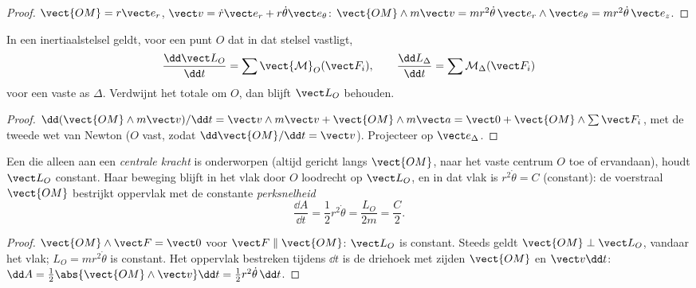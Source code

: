 \begin{proof}
$\vect{OM} = r\vect e_r$, $\vect v = \dot r\vect e_r + r\dot\theta\vect e_\theta$:
$\vect{OM}\wedge m\vect v = mr^2\dot\theta\,\vect e_r\wedge\vect e_\theta = mr^2\dot\theta\,\vect e_z$.
\end{proof}

\begin{theorem}[Impulsmomentstelling]\label{thm:b1:angular-momentum:theorem}
In een inertiaalstelsel geldt, voor een punt $O$ dat in dat stelsel vastligt,
\[
\frac{\dd\vect L_O}{\dd t} = \sum\vect{\mathcal M}_O(\vect F_i),
\qquad
\frac{\dd L_\Delta}{\dd t} = \sum\mathcal M_\Delta(\vect F_i)
\]
voor een vaste as $\Delta$. Verdwijnt het totale  om $O$, dan blijft
$\vect L_O$ behouden.
\end{theorem}

\begin{proof}
$\dd(\vect{OM}\wedge m\vect v)/\dd t = \vect v\wedge m\vect v + \vect{OM}\wedge m\vect a
= \vect 0 + \vect{OM}\wedge\sum\vect F_i$, met de tweede wet van Newton
($O$ vast, zodat $\dd\vect{OM}/\dd t = \vect v$). Projecteer op $\vect e_\Delta$.
\end{proof}

\begin{corollary}\label{cor:b1:angular-momentum:central}
Een  die alleen aan een \emph{centrale kracht} is onderworpen (altijd gericht
langs $\vect{OM}$, naar het vaste centrum $O$ toe of ervandaan), houdt
$\vect L_O$ constant. Haar beweging blijft in het vlak door $O$
loodrecht op $\vect L_O$, en in dat vlak is $r^2\dot\theta = C$
(constant): de voerstraal $\vect{OM}$ bestrijkt oppervlak met de
constante \emph{perksnelheid}
\[
\frac{\dd A}{\dd t} = \frac12 r^2\dot\theta = \frac{L_O}{2m} = \frac{C}{2} .
\]
\end{corollary}

\begin{proof}
$\vect{OM}\wedge\vect F = \vect 0$ voor $\vect F \parallel \vect{OM}$: $\vect L_O$
is constant. Steeds geldt $\vect{OM}\perp\vect L_O$, vandaar het vlak; $L_O =
mr^2\dot\theta$ is constant. Het oppervlak bestreken tijdens $\dd t$ is de
driehoek met zijden $\vect{OM}$ en $\vect v\dd t$: $\dd A = \tfrac12\abs{\vect{OM}
\wedge\vect v}\dd t = \tfrac12 r^2\dot\theta\,\dd t$.
\end{proof}

